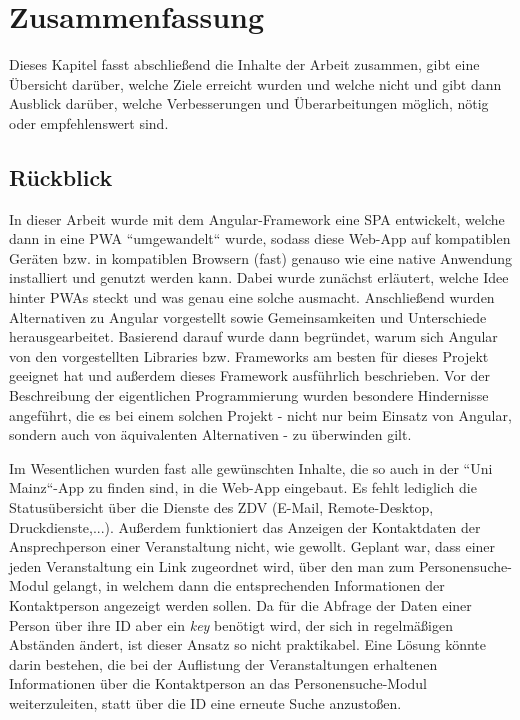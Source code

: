 %
\chapter{Zusammenfassung}
\label{sec:conclusion}

Dieses Kapitel fasst abschließend die Inhalte der Arbeit zusammen, gibt eine Übersicht darüber, welche Ziele erreicht wurden und welche nicht und gibt dann Ausblick darüber, welche Verbesserungen und Überarbeitungen möglich, nötig oder empfehlenswert sind.
\section{Rückblick}
\label{sec:conclusion:sec1}

In dieser Arbeit wurde mit dem Angular-Framework eine \acf{SPA} entwickelt, welche dann in eine \acf{PWA} ``umgewandelt`` wurde, sodass diese Web-App auf kompatiblen Geräten bzw. in kompatiblen Browsern (fast) genauso wie eine native Anwendung installiert und genutzt werden kann. Dabei wurde zunächst erläutert, welche Idee hinter \acsp{PWA} steckt und was genau eine solche ausmacht. Anschließend wurden Alternativen zu Angular vorgestellt sowie Gemeinsamkeiten und Unterschiede herausgearbeitet. Basierend darauf wurde dann begründet, warum sich Angular von den vorgestellten Libraries bzw. Frameworks am besten für dieses Projekt geeignet hat und außerdem dieses Framework ausführlich beschrieben. Vor der Beschreibung der eigentlichen Programmierung wurden besondere Hindernisse angeführt, die es bei einem solchen Projekt - nicht nur beim Einsatz von Angular, sondern auch von äquivalenten Alternativen - zu überwinden gilt.

Im Wesentlichen wurden fast alle gewünschten Inhalte, die so auch in der ``Uni Mainz``-App zu finden sind, in die Web-App eingebaut. Es fehlt lediglich die Statusübersicht über die Dienste des ZDV (E-Mail, Remote-Desktop, Druckdienste,...). Außerdem funktioniert das Anzeigen der Kontaktdaten der Ansprechperson einer Veranstaltung nicht, wie gewollt. Geplant war, dass einer jeden Veranstaltung ein Link zugeordnet wird, über den man zum Personensuche-Modul gelangt, in welchem dann die entsprechenden Informationen der Kontaktperson angezeigt werden sollen. Da für die Abfrage der Daten einer Person über ihre ID aber ein \textit{key} benötigt wird, der sich in regelmäßigen Abständen ändert, ist dieser Ansatz so nicht praktikabel. Eine Lösung könnte darin bestehen, die bei der Auflistung der Veranstaltungen erhaltenen Informationen über die Kontaktperson an das Personensuche-Modul weiterzuleiten, statt über die ID eine erneute Suche anzustoßen.

